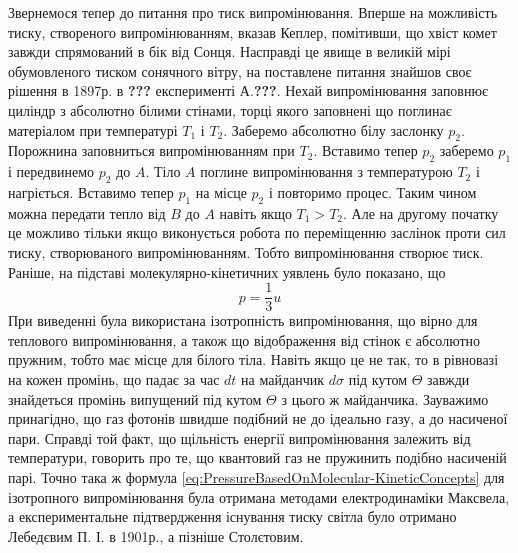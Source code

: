 \documentclass{article}
\begin{document}
\Task{} Звернемося тепер до питання про тиск випромінювання. Вперше на можливість тиску, створеного випромінюванням, вказав Кеплер, помітивши, що хвіст комет завжди спрямований в бік 
від Сонця. Насправді це явище в великій мірі обумовленого тиском сонячного вітру, на поставлене питання знайшов своє рішення в 1897р. в \textbf{???} експерименті А.\textbf{???}. Нехай 
випромінювання заповнює циліндр з абсолютно білими стінами, торці якого заповнені що поглинає матеріалом при температурі $T_{1}$ і $T_{2}$. Заберемо абсолютно білу заслонку $p_{2}$. 
Порожнина заповниться випромінюванням при $T_{2}$. Вставимо тепер $p_{2}$ заберемо $p_{1}$ і передвинемо $p_{2}$ до $A$. Тіло $A$ поглине випромінювання з температурою $T_{2}$ і нагріється. 
Вставимо тепер $p_{1}$ на місце $p_{2}$ і повторимо процес. Таким чином можна передати тепло від $B$ до $A$ навіть якщо $T_{1} > T_{2}$. Але на другому початку це можливо тільки якщо 
виконується робота по переміщенню заслінок проти сил тиску, створюваного випромінюванням. Тобто випромінювання створює тиск. Раніше, на підставі молекулярно-кінетичних уявлень було показано, що 
\begin{equation}
    \label{eq:PressureBasedOnMolecular-KineticConcepts}
    p = \frac{1}{3} u
\end{equation}
При виведенні була використана ізотропність випромінювання, що вірно для теплового випромінювання, а також що відображення від стінок є абсолютно пружним, тобто має місце для білого тіла. 
Навіть якщо це не так, то в рівновазі на кожен промінь, що падає за час $dt$ на майданчик $d\sigma$ під кутом $\Theta$ завжди знайдеться промінь випущений під кутом $\Theta$ з цього ж майданчика. 
Зауважимо принагідно, що газ фотонів швидше подібний не до ідеально газу, а до насиченої пари. Справді той факт, що щільність енергії випромінювання залежить від температури, говорить про те, 
що квантовий газ не пружинить подібно насиченій парі. Точно така ж формула \eqref{eq:PressureBasedOnMolecular-KineticConcepts} для ізотропного випромінювання була отримана методами електродинаміки 
Максвела, а експериментальне підтвердження існування тиску світла було отримано Лебедєвим П. І. в 1901р., а пізніше Столєтовим.
\end{document}
